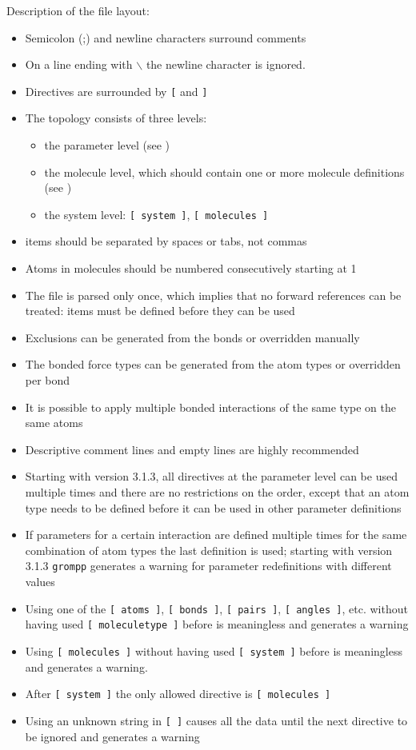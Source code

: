 Description of the file layout:
\begin{itemize}
\item Semicolon (;) and newline characters surround comments
\item On a line ending with $\backslash$ the newline character is ignored.
\item Directives are surrounded by {\tt [} and {\tt ]}
\item The topology consists of three levels:
\begin{itemize}
\item the parameter level (see )
\item the molecule level, which should contain one or more molecule
      definitions (see )
\item the system level: {\tt [~system~]}, {\tt [~molecules~]}
\end{itemize}
\item items should be separated by spaces or tabs, not commas
\item Atoms in molecules should be numbered consecutively starting at 1
\item The file is parsed only once, which implies that no forward
      references can be treated: items must be defined before they
      can be used
\item Exclusions can be generated from the bonds or
      overridden manually
\item The bonded force types can be generated from the atom types or
      overridden per bond
\item It is possible to apply multiple bonded interactions of the same type
      on the same atoms
\item Descriptive comment lines and empty lines are highly recommended
\item Starting with {\gromacs} version 3.1.3, all directives at the
      parameter level can be used multiple times and there are no
      restrictions on the order, except that an atom type needs to be
      defined before it can be used in other parameter definitions
\item If parameters for a certain interaction are defined multiple times
      for the same combination of atom types the last definition is used;
      starting with {\gromacs} version 3.1.3 {\tt grompp} generates a
      warning for parameter redefinitions with different values
\item Using one of the {\tt [~atoms~]}, {\tt [~bonds~]}, 
      {\tt [~pairs~]}, {\tt [~angles~]}, etc. without having used 
      {\tt [~moleculetype~]} 
      before is meaningless and generates a warning
\item Using {\tt [~molecules~]} without having used
      {\tt [~system~]} before is meaningless and generates a warning.
\item After {\tt [~system~]} the only allowed directive is {\tt [~molecules~]}
\item Using an unknown string in {\tt [~]} causes all the data until
      the next directive to be ignored and generates a warning
\end{itemize}

